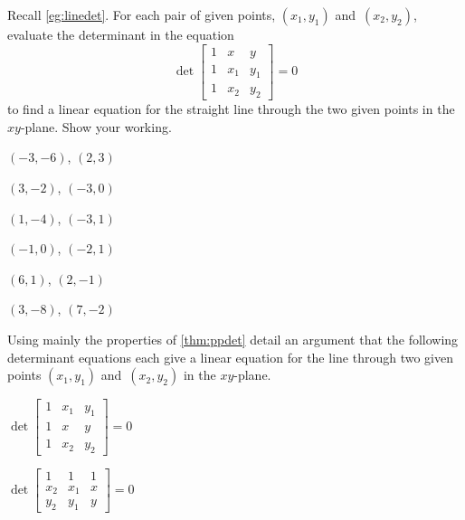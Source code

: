 \begin{exercise}  
Recall \cref{eg:linedet}.
For each pair of given points, \((x_1,y_1)\) and~\((x_2,y_2)\), evaluate the determinant in the equation
\begin{equation*}
\det\begin{bmatrix} 1 &x&y\\1&x_1&y_1\\1&x_2&y_2 \end{bmatrix}=0
\end{equation*}
to find a linear equation for the straight line through the two given points in the \(xy\)-plane.
Show your working.
\begin{Parts}
\item \((-3,-6)\), \((2,3)\)

\item \((3,-2)\), \((-3,0)\)

\item \((1,-4)\), \((-3,1)\)

\item \((-1,0)\), \((-2,1)\)

\begin{reduce}
\item \((6,1)\), \((2,-1)\)

\item \((3,-8)\), \((7,-2)\)
\end{reduce}
\end{Parts}
\end{exercise}




\begin{exercise}  
Using mainly the properties of \cref{thm:ppdet} detail an argument that the following determinant equations each give a linear equation for the line through two given points \((x_1,y_1)\) and~\((x_2,y_2)\) in the \(xy\)-plane.
\begin{Parts}
\item \(\det\begin{bmatrix} 1&x_1&y_1
\\1&x&y
\\1&x_2&y_2 \end{bmatrix}=0\)

\item \(\det\begin{bmatrix} 1&1&1
\\x_2&x_1&x
\\y_2&y_1&y \end{bmatrix}=0\)

\end{Parts}
\end{exercise}





